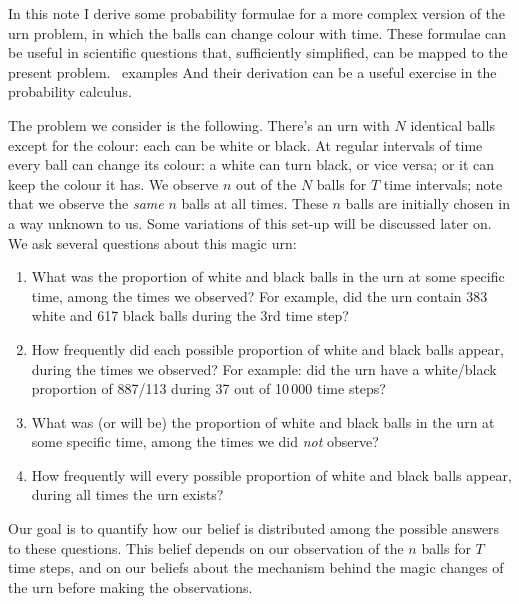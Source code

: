 \documentclass[\ifafour a4paper,12pt,\else a5paper,10pt,\fi%
onecolumn,oneside,article,%
british%
]{memoir}
\theoremstyle{remark}
\theoremstyle{innote}
\renewcommand*{\|}[1][]{\nonscript\,#1\vert\nonscript\;\mathopen{}}
\newcommand*{\puzzle}{{\fontencoding{U}\fontfamily{fontawesometwo}\selectfont\symbol{225}}}
\newcommand{\mynote}[1]{ {\color{notecolour}\puzzle\ #1}}
\begin{document}
In this note I derive some probability formulae for a more complex version
of the urn problem, in which the balls can change colour with time. These
formulae can be useful in scientific questions that, sufficiently
simplified, can be mapped to the present problem.\mynote{examples} And their
derivation can be a useful exercise in the probability calculus.

The problem we consider is the following. There's an urn with $N$ identical
balls except for the colour: each can be white or black. At regular
intervals of time every ball can change its colour: a white can turn black,
or vice versa; or it can keep the colour it has. We observe $n$ out of the
$N$ balls for $T$ time intervals; note that we observe the \emph{same} $n$
balls at all times. These $n$ balls are initially chosen in a way unknown
to us. Some variations of this set-up will be discussed later on.
We ask several questions about this magic urn:
\begin{enumerate}[label=Q\arabic*]
\item \label{item:q_p_known}What was the proportion of white and black
  balls in the urn at some specific time, among the times we observed? For
  example, did the urn contain 383 white and 617 black balls during the
  3rd time step?
\item \label{item:q_f_known}How frequently did each possible proportion of
  white and black balls appear, during the times we observed? For example:
  did the urn have a white/black proportion of 887/113 during 37 out of
  10\,000 time steps?
\item \label{item:q_p_unknown}What was (or will be) the proportion of white
  and black balls in the urn at some specific time, among the times we did
  \emph{not} observe?
\item \label{item:q_f_unknown}How frequently will every possible proportion
  of white and black balls appear, during all times the urn exists?
\end{enumerate}
Our goal is to quantify how our belief is distributed among the possible
answers to these questions. This belief depends on our observation of the
$n$ balls for $T$ time steps, and on our beliefs about the mechanism
behind the magic changes of the urn before making the observations.
\end{document}
